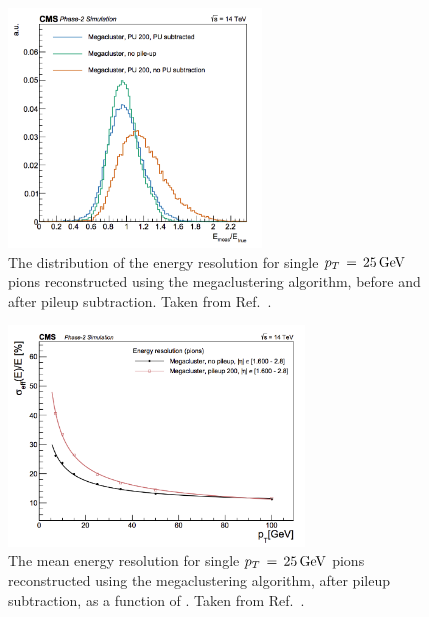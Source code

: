 \begin{figure}[h!]
  \centering
  \includegraphics[width=0.6\textwidth]{Figures/HGCAL/SingleMegacluster.png}
  \caption[HGCAL pion energy response.]
  {
    The distribution of the energy resolution for single $p_T\,=\,\SI{25}{GeV}$ pions 
    reconstructed using the megaclustering algorithm, 
    before and after pileup subtraction. 
    Taken from Ref.~\cite{HGCAL}.
  }
  \label{fig:hgcal_SingleMegacluster}
\end{figure}

\begin{figure}[h!]
  \centering
  \includegraphics[width=0.7\textwidth]{Figures/HGCAL/MegaclusterVsPt.png}
  \caption[HGCAL pion energy resolution as a function of \pt.]
  {
    The mean energy resolution for single $p_T\,=\,\SI{25}{GeV}$ pions 
    reconstructed using the megaclustering algorithm, after pileup subtraction, 
    as a function of \pt. 
    Taken from Ref.~\cite{HGCAL}.
  }
  \label{fig:hgcal_MegaclusterVsPt}
\end{figure}

